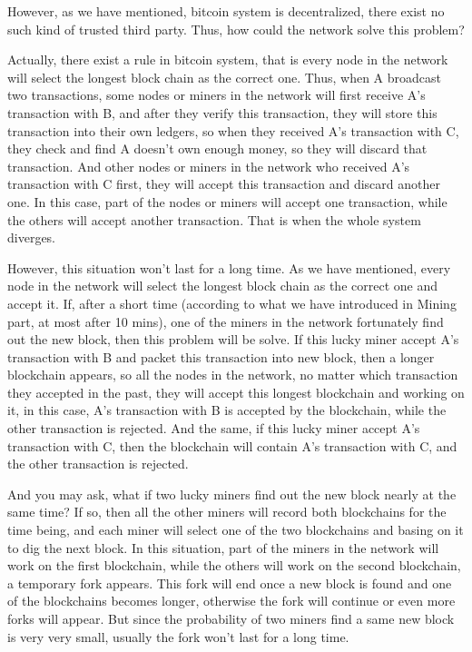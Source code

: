 \documentclass[12pt,a4paper]{article}
\begin{document}
 However, as we have mentioned, bitcoin system is decentralized, there exist no such kind of trusted third party. Thus, how could the network solve this problem?
 
 Actually, there exist a rule in bitcoin system, that is every node in the network will select the longest block chain as the correct one. Thus, when A broadcast two transactions, some nodes or miners in the network will first receive A's transaction with B, and after they verify this transaction, they will store this transaction into their own ledgers, so when they received A's transaction with C, they check and find A doesn't own enough money, so they will discard that transaction. And other nodes or miners in the network who received A's transaction with C first, they will accept this transaction and discard another one. In this case, part of the nodes or miners will accept one transaction, while the others will accept another transaction. That is when the whole system diverges.
 
 However, this situation won't last for a long time. As we have mentioned, every node in the network will select the longest block chain as the correct one and accept it. If, after a short time (according to what we have introduced in Mining part, at most after 10 mins), one of the miners in the network fortunately find out the new block, then this problem will be solve. If this lucky miner accept A's transaction with B and packet this transaction into new block, then a longer blockchain appears, so all the nodes in the network, no matter which transaction they accepted in the past, they will accept this longest blockchain and working on it, in this case, A's transaction with B is accepted by the blockchain, while the other transaction is rejected. And the same, if this lucky miner accept A's transaction with C, then the blockchain will contain A's transaction with C, and the other transaction is rejected.
 
 And you may ask, what if two lucky miners find out the new block nearly at the same time? If so, then all the other miners will record both blockchains for the time being, and each miner will select one of the two blockchains and basing on it to dig the next block. In this situation, part of the miners in the network will work on the first blockchain, while the others will work on the second blockchain, a temporary fork appears. This fork will end once a new block is found and one of the blockchains becomes longer, otherwise the fork will continue or even more forks will appear. But since the probability of two miners find a same new block is very very small, usually the fork won't last for a long time.
 
\end{document}
